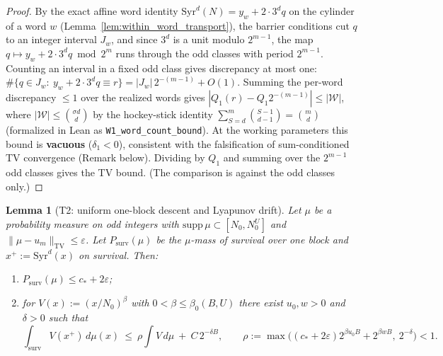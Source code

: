 \documentclass[12pt,a4paper]{article}
\newtheorem{lemma}[theorem]{Lemma}
\theoremstyle{remark}
\begin{document}
\begin{proof}
By the exact affine word identity
$\mathrm{Syr}^d(N)=y_w+2\cdot3^d q$ on the cylinder of a word $w$
(Lemma~\ref{lem:within_word_transport}), the barrier conditions cut $q$ to an
integer interval $J_w$, and since $3^d$ is a unit modulo $2^{m-1}$, the map
$q\mapsto y_w+2\cdot3^dq\bmod2^m$ runs through the odd classes with period
$2^{m-1}$. Counting an interval in a fixed odd class gives discrepancy at most
one:
$\#\{q\in J_w:\ y_w+2\cdot3^dq\equiv r\}=|J_w|\,2^{-(m-1)}+O(1)$.
Summing the per-word discrepancy $\le 1$ over the realized words gives $|Q_1(r) - Q_1 2^{-(m-1)}| \le |\mathcal{W}|$, where $|\mathcal{W}| \le \binom{\sigma d}{d}$ by the hockey-stick identity $\sum_{S=d}^{m}\binom{S-1}{d-1}=\binom{m}{d}$ (formalized in Lean as \texttt{W1\_word\_count\_bound}). At the working parameters this bound is \textbf{vacuous} ($\delta_1 < 0$), consistent with the falsification of sum-conditioned TV convergence (Remark below). Dividing by $Q_1$ and summing over the $2^{m-1}$ odd classes gives the
TV bound. (The comparison is against the odd classes only.)
\end{proof}
\begin{lemma}[T2: uniform one-block descent and Lyapunov drift]
\label{lem:T2}
Let $\mu$ be a probability measure on odd integers with
$\mathrm{supp}\,\mu\subset[N_0,N_0^{U}]$ and $\|\mu-
u_m\|_{\mathrm{TV}}\le\varepsilon$.
Let $P_{\mathrm{surv}}(\mu)$ be the $\mu$-mass of survival over one block and
$x^+:=\mathrm{Syr}^d(x)$ on survival. Then:
\begin{enumerate}
\item[(i)] $P_{\mathrm{surv}}(\mu)\le c_*+2\varepsilon$;
\item[(ii)] for $V(x):=(x/N_0)^{\beta}$ with $0<\beta\le\beta_0(B,U)$ there exist
$u_0,w>0$ and $\delta>0$ such that
\[
\int_{\mathrm{surv}}V(x^+)\,d\mu(x)
\ \le\ \rho\int V\,d\mu\ +\ C\,2^{-\delta B},
\qquad
\rho:=\max\big((c_*+2\varepsilon)2^{\beta u_0B}+2^{\beta wB},\ 2^{-\delta}\big)<1 .
\]
\end{enumerate}
\end{lemma}
\end{document}
